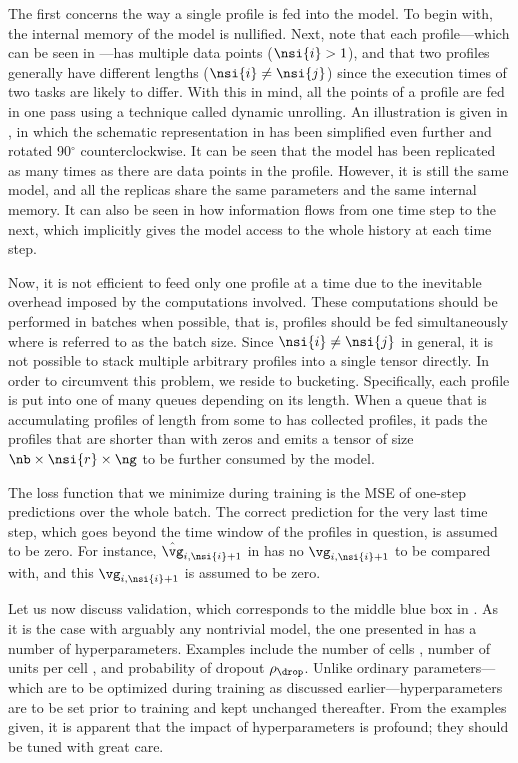 The first concerns the way a single profile is fed into the model. To begin
with, the internal memory of the model is nullified. Next, note that each
profile---which can be seen in ---has multiple data points
($\nsi{i} > 1$), and that two profiles generally have different lengths
($\nsi{i} \neq \nsi{j}$) since the execution times of two tasks are likely to
differ. With this in mind, all the points of a profile are fed in one pass using
a technique called dynamic unrolling. An illustration is given in
, in which the schematic representation in
 has been simplified even further and rotated 90${}^\circ$
counterclockwise. It can be seen that the model has been replicated as many
times as there are data points in the profile. However, it is still the same
model, and all the replicas share the same parameters and the same internal
memory. It can also be seen in  how information flows from
one time step to the next, which implicitly gives the model access to the whole
history at each time step.

Now, it is not efficient to feed only one profile at a time due to the
inevitable overhead imposed by the computations involved. These computations
should be performed in batches when possible, that is, \nb profiles should be
fed simultaneously where \nb is referred to as the batch size. Since $\nsi{i}
\neq \nsi{j}$ in general, it is not possible to stack multiple arbitrary
profiles into a single tensor directly. In order to circumvent this problem, we
reside to bucketing. Specifically, each profile is put into one of many queues
depending on its length. When a queue that is accumulating profiles of length
from some  to  has collected \nb profiles, it pads the profiles
that are shorter than  with zeros and emits a tensor of size $\nb \times
\nsi{r} \times \ng$ to be further consumed by the model.

The loss function that we minimize during training is the \ac{MSE} of one-step
predictions over the whole batch. The correct prediction for the very last time
step, which goes beyond the time window of the profiles in question, is assumed to
be zero. For instance, $\hat{\vg}_{i, \nsi{i} + 1}$ in  has
no $\vg_{i, \nsi{i} + 1}$ to be compared with, and this $\vg_{i, \nsi{i} + 1}$
is assumed to be zero.

Let us now discuss validation, which corresponds to the middle blue box in
. As it is the case with arguably any nontrivial model,
the one presented in  has a number of hyperparameters.
Examples include the number of cells \nc, number of units per cell \nu, and
probability of dropout $\rho_\drop$. Unlike ordinary parameters---which are to
be optimized during training as discussed earlier---hyperparameters are to be
set prior to training and kept unchanged thereafter. From the examples given, it
is apparent that the impact of hyperparameters is profound; they should be
tuned with great care.

